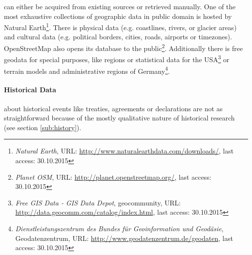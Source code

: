 can either be acquired from existing sources or retrieved manually. One of the most exhaustive collections of geographic data in public domain is hosted by Natural Earth\footnote{
  \textit{Natural Earth},
  URL: \url{http://www.naturalearthdata.com/downloads/},
  last access: 30.10.2015
}.
There is physical data (e.g. coastlines, rivers, or glacier areas) and cultural data (e.g. political borders, cities, roads, airports or timezones). OpenStreetMap also opens its database to the public\footnote{
  \textit{Planet OSM},
  URL: \url{http://planet.openstreetmap.org/},
  last access: 30.10.2015
}.
Additionally there is free geodata for special purposes, like regions or statistical data for the USA\footnote{
  \textit{Free GIS Data - GIS Data Depot},
  geocommunity,
  URL: \url{http://data.geocomm.com/catalog/index.html},
  last access: 30.10.2015
}
or terrain models and administrative regions of Germany\footnote{
  \textit{Dienstleistungszentrum des Bundes für Geoinformation und Geodäsie},
  Geodatenzentrum,
  URL: \url{http://www.geodatenzentrum.de/geodaten},
  last access: 30.10.2015
}.


\paragraph{Historical Data} %
\label{par:historical_data_input}

about historical events like treaties, agreements or declarations are not as straightforward because of the mostly qualitative nature of historical research (see section \ref{sub:history}).

